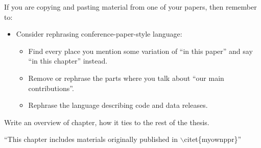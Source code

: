 \def\adult{\texttt{adult}\xspace}
\def\poundslost{\texttt{pounds\_lost}\xspace}
\def\motivation{\texttt{motivation}\xspace}
\def\regimen{\texttt{regimen\_condition}\xspace}
\def\regimencondition{\texttt{regimen\_condition}\xspace}
\def\group{\texttt{group}\xspace}
\def\age{\texttt{age}\xspace}

If you are copying and pasting material from one of your papers, then remember to:
\begin{itemize}
    \item Consider rephrasing conference-paper-style language:
    \begin{itemize}
        \item Find every place you mention some variation of ``in this paper'' and say ``in this chapter'' instead.
        \item Remove or rephrase the parts where you talk about ``our main contributions''.
        \item Rephrase the language describing code and data releases.
    \end{itemize}
\end{itemize}

{\color{orange} Write an overview of chapter, how it ties to the rest of the thesis.}

{\color{orange} ``This chapter includes materials originally published in $\backslash$citet\{myownppr\}''}

